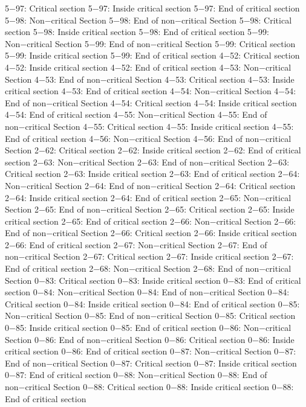 5−97: Critical section
5−97: Inside critical section
5−97: End of critical section
5−98: Non−critical Section
5−98: End of non−critical Section
5−98: Critical section
5−98: Inside critical section
5−98: End of critical section
5−99: Non−critical Section
5−99: End of non−critical Section
5−99: Critical section
5−99: Inside critical section
5−99: End of critical section
4−52: Critical section
4−52: Inside critical section
4−52: End of critical section
4−53: Non−critical Section
4−53: End of non−critical Section
4−53: Critical section
4−53: Inside critical section
4−53: End of critical section
4−54: Non−critical Section
4−54: End of non−critical Section
4−54: Critical section
4−54: Inside critical section
4−54: End of critical section
4−55: Non−critical Section
4−55: End of non−critical Section
4−55: Critical section
4−55: Inside critical section
4−55: End of critical section
4−56: Non−critical Section
4−56: End of non−critical Section
2−62: Critical section
2−62: Inside critical section
2−62: End of critical section
2−63: Non−critical Section
2−63: End of non−critical Section
2−63: Critical section
2−63: Inside critical section
2−63: End of critical section
2−64: Non−critical Section
2−64: End of non−critical Section
2−64: Critical section
2−64: Inside critical section
2−64: End of critical section
2−65: Non−critical Section
2−65: End of non−critical Section
2−65: Critical section
2−65: Inside critical section
2−65: End of critical section
2−66: Non−critical Section
2−66: End of non−critical Section
2−66: Critical section
2−66: Inside critical section
2−66: End of critical section
2−67: Non−critical Section
2−67: End of non−critical Section
2−67: Critical section
2−67: Inside critical section
2−67: End of critical section
2−68: Non−critical Section
2−68: End of non−critical Section
0−83: Critical section
0−83: Inside critical section
0−83: End of critical section
0−84: Non−critical Section
0−84: End of non−critical Section
0−84: Critical section
0−84: Inside critical section
0−84: End of critical section
0−85: Non−critical Section
0−85: End of non−critical Section
0−85: Critical section
0−85: Inside critical section
0−85: End of critical section
0−86: Non−critical Section
0−86: End of non−critical Section
0−86: Critical section
0−86: Inside critical section
0−86: End of critical section
0−87: Non−critical Section
0−87: End of non−critical Section
0−87: Critical section
0−87: Inside critical section
0−87: End of critical section
0−88: Non−critical Section
0−88: End of non−critical Section
0−88: Critical section
0−88: Inside critical section
0−88: End of critical section

